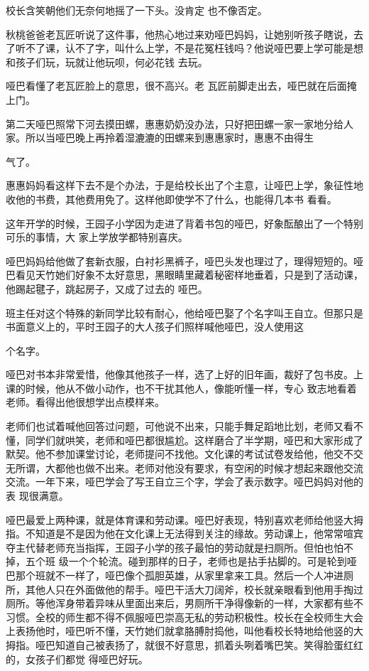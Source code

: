\documentclass{article}
\begin{document}
校长含笑朝他们无奈何地摇了一下头。没肯定
也不像否定。 

秋桃爸爸老瓦匠听说了这件事，他热心地过来劝哑巴妈妈，让她别听孩子瞎说，去了听不了课，认不了字，叫什么上学，不是花冤枉钱吗？他说哑巴要上学可能是想和孩子们玩，玩就让他玩呗，何必花钱
去玩。 

哑巴看懂了老瓦匠脸上的意思，很不高兴。老
瓦匠前脚走出去，哑巴就在后面掩上门。 

第二天哑巴照常下河去摸田螺，惠惠奶奶没办法，只好把田螺一家一家地分给人家。所以当哑巴晚上再拎着湿漉漉的田螺来到惠惠家时，惠惠不由得生
\newpage

气了。 

惠惠妈妈看这样下去不是个办法，于是给校长出了个主意，让哑巴上学，象征性地收他的书费，其他费用免了。这样他即使学不了什么，也能得几本书
看看。 

这年开学的时候，王园子小学因为走进了背着书包的哑巴，好象酝酿出了一个特别可乐的事情，大
家上学放学都特别喜庆。 

哑巴妈妈给他做了套新衣服，白衬衫黑裤子，哑巴头发也理过了，理得短短的。哑巴看见天竹她们好象不太好意思，黑眼睛里藏着秘密样地垂着，只是到了活动课，他踢起毽子，跳起房子，又成了过去的
哑巴。 

班主任对这个特殊的新同学比较有耐心，他给哑巴娶了个名字叫王自立。但那只是书面意义上的，平时王园子的大人孩子们照样喊他哑巴，没人使用这

\newpage
个名字。 

哑巴对书本非常爱惜，他像其他孩子一样，选了上好的旧年画，裁好了包书皮。上课的时候，他从不做小动作，也不干扰其他人，像能听懂一样，专心
致志地看着老师。看得出他很想学出点模样来。 

老师们也试着喊他回答过问题，可他说不出来，只能手舞足蹈地比划，老师又看不懂，同学们就哄笑，老师和哑巴都很尴尬。这样磨合了半学期，哑巴和大家形成了默契。他不参加课堂讨论，老师提问不找他。文化课的考试试卷发给他，他交不交无所谓，大都他也做不出来。老师对他没有要求，有空闲的时候才想起来跟他交流交流。一年下来，哑巴学会了写王自立三个字，学会了表示数字。哑巴妈妈对他的表
现很满意。 

哑巴最爱上两种课，就是体育课和劳动课。哑巴好表现，特别喜欢老师给他竖大拇指。不知道是不是因为他在文化课上无法得到关注的缘故。劳动课上，他常常喧宾夺主代替老师充当指挥，王园子小学的孩子最怕的劳动就是扫厕所。但怕也怕不掉，五个班
\newpage
级一个个轮流。碰到那样的日子，老师也是拈手拈脚的。可是轮到哑巴那个班就不一样了，哑巴像个孤胆英雄，从家里拿来工具。然后一个人冲进厕所，其他人只在外面做他的帮手。哑巴干活大刀阔斧，校长就亲眼看到他用手掏过厕所。等他浑身带着异味从里面出来后，男厕所干净得像新的一样，大家都有些不习惯。全校的师生都不得不佩服哑巴崇高无私的劳动积极性。校长在全校师生大会上表扬他时，哑巴听不懂，天竹她们就拿胳膊肘捣他，叫他看校长特地给他竖的大拇指。哑巴知道自己被表扬了，就很不好意思，抓着头咧着嘴巴笑。笑得脸蛋红红的，女孩子们都觉
得哑巴好玩。 
\end{document}
